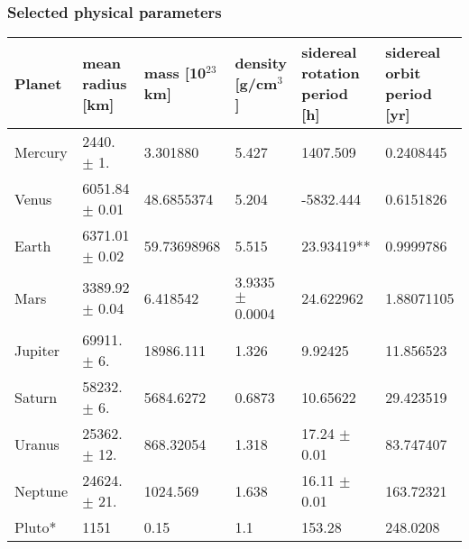 \documentclass[Orbiter User Manual.tex]{subfiles}
\begin{document}
\subsubsection{Selected physical parameters}

	\begin{longtable}{ |p{}|p{}|p{}|p{}|p{}|p{}| }
	\hline\rule{0pt}{2ex}
	\textbf{Planet} & \textbf{mean radius [km]} & \textbf{mass [10$^{23}$ km]} & \textbf{density [g/cm$^{3}$]} & \textbf{sidereal rotation period [h]} & \textbf{sidereal orbit period [yr]}\\
	\hline\rule{0pt}{2ex}
	Mercury & 2440. $\pm$ 1. & 3.301880 & 5.427 & 1407.509 & 0.2408445\\
	\hline\rule{0pt}{2ex}
	Venus & 6051.84 $\pm$ 0.01 & 48.6855374 & 5.204 & -5832.444 & 0.6151826\\
	\hline\rule{0pt}{2ex}
	Earth & 6371.01 $\pm$ 0.02 & 59.73698968 & 5.515 & 23.93419** & 0.9999786\\
	\hline\rule{0pt}{2ex}
	Mars & 3389.92 $\pm$ 0.04 & 6.418542 & 3.9335 $\pm$ 0.0004 & 24.622962 & 1.88071105\\
	\hline\rule{0pt}{2ex}
	Jupiter & 69911. $\pm$ 6. & 18986.111 & 1.326 & 9.92425 & 11.856523\\
	\hline\rule{0pt}{2ex}
	Saturn & 58232. $\pm$ 6. & 5684.6272 & 0.6873 & 10.65622 & 29.423519\\
	\hline\rule{0pt}{2ex}
	Uranus & 25362. $\pm$ 12. & 868.32054 & 1.318 & 17.24 $\pm$ 0.01 & 83.747407\\
	\hline\rule{0pt}{2ex}
	Neptune & 24624. $\pm$ 21. & 1024.569 & 1.638 & 16.11 $\pm$ 0.01 & 163.72321\\
	\hline\rule{0pt}{2ex}
	Pluto* & 1151 & 0.15 & 1.1 & 153.28 & 248.0208\\
	\hline
	\end{longtable}
\end{document}
